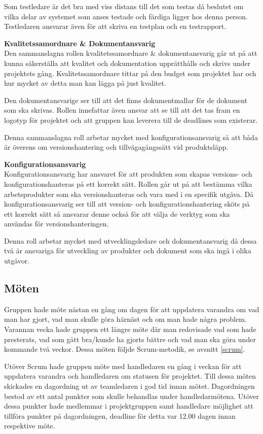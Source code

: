 Som testledare är det bra med viss distans till det som testas då beslutet om vilka delar av systemet som anses testade och färdiga ligger hos denna person. Testledaren ansvarar även för att skriva en testplan och en testrapport.

\textbf{Kvalitetssamordnare \& Dokumentansvarig}\\
Den sammanslagna rollen kvalitetssamordnare \& dokumentansvarig går ut på att kunna säkerställa att kvalitet och dokumentation upprätthålls och skrivs under projektets gång. Kvalitetssamordnare tittar på den budget som projektet har och hur mycket av detta man kan lägga på just kvalitet.

Den dokumentansvarige ser till att det finns dokumentmallar för de dokument som ska skrivas. Rollen innefattar även ansvar att se till att det tas fram en logotyp för projektet och att gruppen kan leverera till de deadlines som existerar.

Denna sammanslagna roll arbetar mycket med konfigurationsansvarig så att båda är överens om versionshantering och tillvägagångssätt vid produktsläpp.

\textbf{Konfigurationsansvarig}
\\Konfigurationsansvarig har ansvaret för att produkten som skapas versions- och konfigurationshanteras på ett korrekt sätt. Rollen går ut på att bestämma vilka arbetsprodukter som ska versionshanteras och vara med i en specifik utgåva. Då konfigurationsansvarig ser till att version- och konfigurationshantering sköts på ett korrekt sätt så ansvarar denne också för att välja de verktyg som ska användas för versionshanteringen.

Denna roll arbetar mycket med utvecklingsledare och dokumentansvarig då dessa två är ansvariga för utveckling av produkter och dokument som ska ingå i olika utgåvor.

\subsection{Möten}
Gruppen hade möte nästan en gång om dagen för att uppdatera varandra om vad man har gjort, vad man skulle göra härnäst och om man hade några problem. Varannan vecka hade gruppen ett längre möte där man redovisade vad som hade presterats, vad som gått bra/kunde ha gjorts bättre och vad man ska göra under kommande två veckor. Dessa möten följde Scrum-metodik, se avsnitt \ref{scrum}.

Utöver Scrum hade gruppen möte med handledaren en gång i veckan för att uppdatera varandra och handledaren om statusen för projektet. Till dessa möten skickades en dagordning ut av teamledaren i god tid innan mötet. Dagordningen bestod av ett antal punkter som skulle behandlas under handledarmötena. 
Utöver dessa punkter hade medlemmar i projektgruppen samt handledare möjlighet att tillföra punkter på dagordningen, deadline för detta var 12.00 dagen innan respektive möte.

